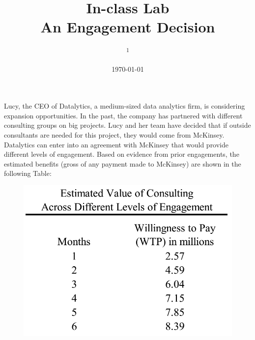 \documentclass[10pt, a4paper]{ctexart} %
\title{In-class Lab\\An Engagement Decision} %
\author{
	\authorstyle{鲁晓东\textsuperscript{1}} %
	\newline\newline %
	\textsuperscript{1}\institution{中山大学岭南学院经济学系}\\ %
}
\date{\today} %
\begin{document}
\maketitle %

\thispagestyle{firstpage} %


	
	








Lucy, the CEO of Datalytics, a medium-sized data analytics firm, is considering expansion opportunities. In the past, the company has partnered with different consulting groups on big projects. Lucy and her team have decided that if outside consultants are needed for this project, they would come from McKinsey. 
Datalytics can enter into an agreement with McKinsey that would provide different levels of engagement. Based on evidence from prior engagements, the estimated benefits (gross of any payment made to McKinsey) are shown in the following Table: 


\begin{figure}[ht]
	\centering
	\includegraphics[scale=0.4]{fig//mckinsey.png} %
	\caption{} %
	\label{mckinsey} %
\end{figure}
\end{document}
